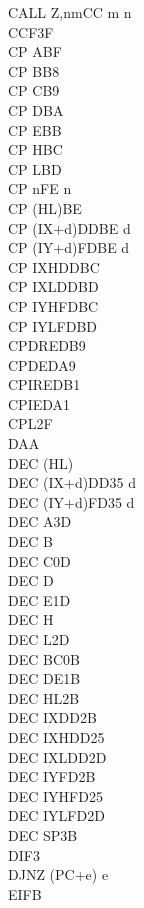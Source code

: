 \begin{multicols}{3}
{\begin{tabbing}
		CALL Z,nm\>CC m n\\
		CCF\>3F\\
		CP A\>BF\\
		CP B\>B8\\
		CP C\>B9\\
		CP D\>BA\\
		CP E\>BB\\
		CP H\>BC\\
		CP L\>BD\\
		CP n\>FE n\\
		CP (HL)\>BE\\
		CP (IX+d)\>DDBE d\\
		CP (IY+d)\>FDBE d\\
		CP IXH\UNDOC\>DDBC\\
		CP IXL\UNDOC\>DDBD\\
		CP IYH\UNDOC\>FDBC\\
		CP IYL\UNDOC\>FDBD\\
		CPDR\>EDB9\\
		CPD\>EDA9\\
		CPIR\>EDB1\\
		CPI\>EDA1\\
		CPL\>2F\\
		DAA\\
		DEC (HL)\\
		DEC (IX+d)\>DD35 d\\
		DEC (IY+d)\>FD35 d\\
		DEC A\>3D\\
		DEC B\\
		DEC C\>0D\\
		DEC D\\
		DEC E\>1D\\
		DEC H\\
		DEC L\>2D\\
		DEC BC\>0B\\
		DEC DE\>1B\\
		DEC HL\>2B\\
		DEC IX\>DD2B\\
		DEC IXH\UNDOC\>DD25\\
		DEC IXL\UNDOC\>DD2D\\
		DEC IY\>FD2B\\
		DEC IYH\UNDOC\>FD25\\
		DEC IYL\UNDOC\>FD2D\\
		DEC SP\>3B\\
		DI\>F3\\
		DJNZ (PC+e) e\\
		EI\>FB\\

\end{tabbing}}
\end{multicols}
